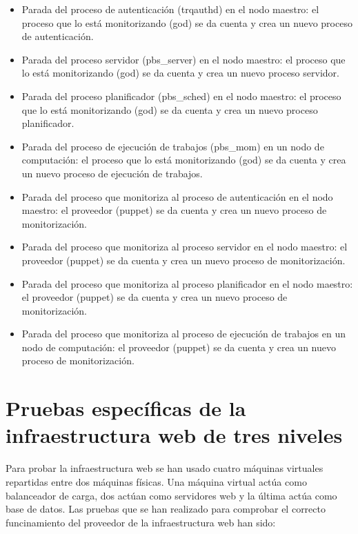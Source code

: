 \begin{itemize}
\item Parada del proceso de autenticación (trqauthd) en el nodo maestro: el proceso que lo está monitorizando (god) se da cuenta y crea un nuevo proceso de autenticación.
\item Parada del proceso servidor (pbs\_server) en el nodo maestro: el proceso que lo está monitorizando (god) se da cuenta y crea un nuevo proceso servidor.
\item Parada del proceso planificador (pbs\_sched) en el nodo maestro: el proceso que lo está monitorizando (god) se da cuenta y crea un nuevo proceso planificador.
\item Parada del proceso de ejecución de trabajos (pbs\_mom) en un nodo de computación: el proceso que lo está monitorizando (god) se da cuenta y crea un nuevo proceso de ejecución de trabajos.
\item Parada del proceso que monitoriza al proceso de autenticación en el nodo maestro: el proveedor (puppet) se da cuenta y crea un nuevo proceso de monitorización.
\item Parada del proceso que monitoriza al proceso servidor en el nodo maestro: el proveedor (puppet) se da cuenta y crea un nuevo proceso de monitorización.
\item Parada del proceso que monitoriza al proceso planificador en el nodo maestro: el proveedor (puppet) se da cuenta y crea un nuevo proceso de monitorización.
\item Parada del proceso que monitoriza al proceso de ejecución de trabajos en un nodo de computación: el proveedor (puppet) se da cuenta y crea un nuevo proceso de monitorización.
\end{itemize}


\section{Pruebas específicas de la infraestructura web de tres niveles}

Para probar la infraestructura web se han usado cuatro máquinas virtuales repartidas entre dos máquinas físicas. Una máquina virtual actúa como balanceador de carga, dos actúan como servidores web y la última actúa como base de datos. Las pruebas que se han realizado para comprobar el correcto funcinamiento del proveedor de la infraestructura web han sido:

